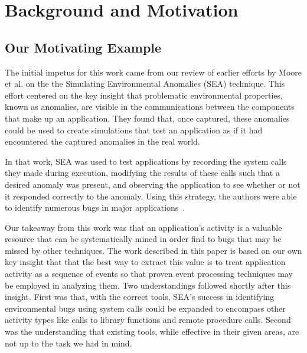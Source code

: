 \section{Background and Motivation}
\label{SEC:background}


\subsection{Our Motivating Example}


The initial impetus for this work came from our review
of earlier efforts by Moore et al. on the
the Simulating Environmental Anomalies (SEA) technique.
This effort centered on the key insight
that problematic
environmental properties,
known as anomalies, are visible in the
communications between the components that make up an application.
They found that,
once captured,
these anomalies
could be
used to create simulations
that test
an application as if
it had encountered the captured anomalies
in the real world.

In that work, SEA was used to test applications
by recording the system calls they made
during execution,
modifying the results of these calls such that a desired anomaly
was present,
and observing the application to see whether or not it
responded correctly to the anomaly.
Using this strategy, the authors were able to identify numerous bugs
in major applications~\cite{crashsim}.

Our takeaway from this work
was that an application's activity
is a valuable resource that can be systematically mined
in order find to bugs
that may be missed by other techniques.
The work described in this paper
is based on our own key insight that that the best way to extract this
value
is to treat application activity
as a sequence of events
so that proven event processing techniques
may be employed in analyzing them.
Two understandings followed shortly after this
insight.
First was that, with the correct tools,
SEA's success in identifying environmental bugs using system calls
could be expanded
to encompass other activity types
like calls to library functions
and remote procedure calls.
Second was the understanding that existing tools,
while effective in their given areas,
are not up to the
task we had in mind.



